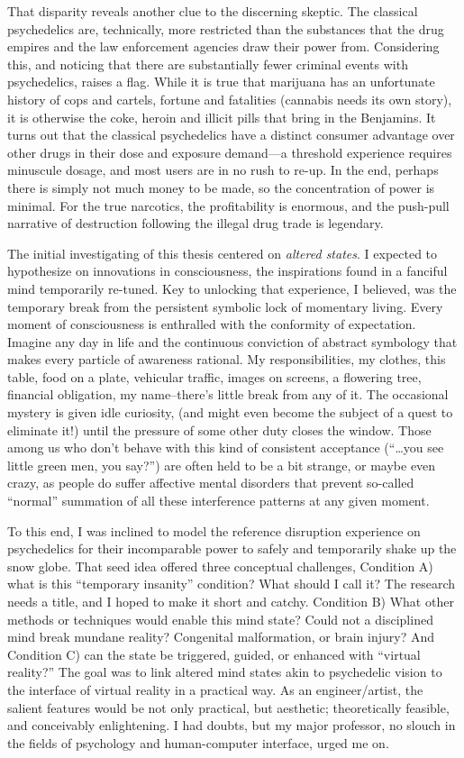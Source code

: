 \documentclass{UIdahoMastersThesis}
\begin{document}
That disparity reveals another clue to the discerning skeptic. The classical psychedelics are, technically, more restricted than the substances that the drug empires and the law enforcement agencies draw their power from. Considering this, and noticing that there are substantially fewer criminal events with psychedelics, raises a flag. While it is true that marijuana has an unfortunate history of cops and cartels, fortune and fatalities (cannabis needs its own story), it is otherwise the coke, heroin and illicit pills that bring in the Benjamins. It turns out that the classical psychedelics have a distinct consumer advantage over other drugs in their dose and exposure demand---a threshold experience requires minuscule dosage, and most users are in no rush to re-up. In the end, perhaps there is simply not much money to be made, so the concentration of power is minimal. For the true narcotics, the profitability is enormous, and the push-pull narrative of destruction following the illegal drug trade is legendary.
 
The initial investigating of this thesis centered on \emph{altered states}. I expected to hypothesize on innovations in consciousness, the inspirations found in a fanciful mind temporarily re-tuned. Key to unlocking that experience, I believed, was the temporary break from the persistent symbolic lock of momentary living. Every moment of consciousness is enthralled with the conformity of expectation. Imagine any day in life and the continuous conviction of abstract symbology that makes every particle of awareness rational. My responsibilities, my clothes, this table, food on a plate, vehicular traffic, images on screens, a flowering tree, financial obligation, my name--there's little break from any of it. The occasional mystery is given idle curiosity, (and might even become the subject of a quest to eliminate it!) until the pressure of some other duty closes the window. Those among us who don't behave with this kind of consistent acceptance (``\ldots you see little green men, you say?'') are often held to be a bit strange, or maybe even crazy, as people do suffer affective mental disorders that prevent so-called ``normal'' summation of all these interference patterns at any given moment.

To this end, I was inclined to model the reference disruption experience on psychedelics for their incomparable power to safely and temporarily shake up the snow globe. That seed idea offered three conceptual challenges, Condition A) what is this ``temporary insanity'' condition? What should I call it? The research needs a title, and I hoped to make it short and catchy. Condition B) What other methods or techniques would enable this mind state? Could not a disciplined mind break mundane reality? Congenital malformation, or brain injury? And Condition C) can the state be triggered, guided, or enhanced with ``virtual reality?''
The goal was to link altered mind states akin to psychedelic vision to the interface of virtual reality in a practical way. As an engineer/artist, the salient features would be not only practical, but aesthetic; theoretically feasible, and conceivably enlightening. I had doubts, but my major professor, no slouch in the fields of psychology and human-computer interface, urged me on.
\end{document}
